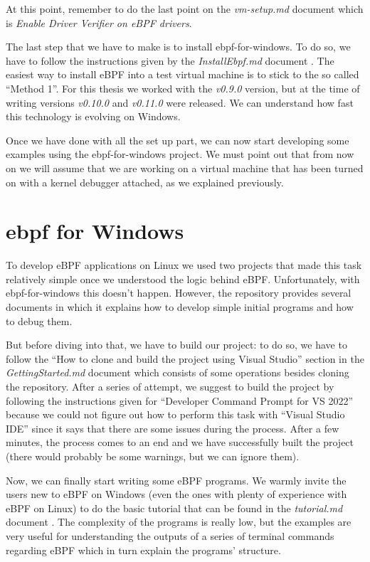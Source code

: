 At this point, remember to do the last point on the \textit{vm-setup.md} document which is \textit{Enable Driver Verifier on eBPF drivers}.

The last step that we have to make is to install ebpf-for-windows.
To do so, we have to follow the instructions given by the \textit{InstallEbpf.md} document \cite{InseBPFDoc}.
The easiest way to install eBPF into a test virtual machine is to stick to the so called ``Method 1''.
For this thesis we worked with the \textit{v0.9.0} version, but at the time of writing versions \textit{v0.10.0} and \textit{v0.11.0} were released.
We can understand how fast this technology is evolving on Windows.

Once we have done with all the set up part, we can now start developing some examples using the ebpf-for-windows project.
We must point out that from now on we will assume that we are working on a virtual machine that has been turned on with a kernel debugger attached, as we explained previously.

\section{ebpf for Windows}

To develop eBPF applications on Linux we used two projects that made this task relatively simple once we understood the logic behind eBPF.
Unfortunately, with ebpf-for-windows this doesn't happen.
However, the repository provides several documents in which it explains how to develop simple initial programs and how to debug them.

But before diving into that, we have to build our project: to do so, we have to follow the ``How to clone and build the project using Visual Studio'' section in the \textit{GettingStarted.md} document which consists of some operations besides cloning the repository.
After a series of attempt, we suggest to build the project by following the instructions given for ``Developer Command Prompt for VS 2022'' because we could not figure out how to perform this task with ``Visual Studio IDE'' since it says that there are some issues during the process.
After a few minutes, the process comes to an end and we have successfully built the project (there would probably be some warnings, but we can ignore them).

Now, we can finally start writing some eBPF programs.
We warmly invite the users new to eBPF on Windows (even the ones with plenty of experience with eBPF on Linux) to do the basic tutorial that can be found in the \textit{tutorial.md} document \cite{TutDoc}.
The complexity of the programs is really low, but the examples are very useful for understanding the outputs of a series of terminal commands regarding eBPF which in turn explain the programs' structure.

